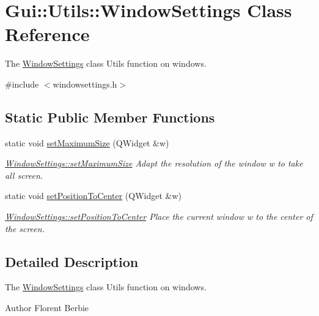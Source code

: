 \hypertarget{classGui_1_1Utils_1_1WindowSettings}{\section{Gui\-:\-:Utils\-:\-:Window\-Settings Class Reference}
\label{classGui_1_1Utils_1_1WindowSettings}
}


The \hyperlink{classGui_1_1Utils_1_1WindowSettings}{Window\-Settings} class Utils function on windows.  




{\ttfamily \#include $<$windowsettings.\-h$>$}

\subsection*{Static Public Member Functions}
\begin{DoxyCompactItemize}
\item 
static void \hyperlink{classGui_1_1Utils_1_1WindowSettings_a87db449398662e73bd6798efadabeb34}{set\-Maximum\-Size} (Q\-Widget \&w)
\begin{DoxyCompactList}\small\item\em \hyperlink{classGui_1_1Utils_1_1WindowSettings_a87db449398662e73bd6798efadabeb34}{Window\-Settings\-::set\-Maximum\-Size} Adapt the resolution of the window {\itshape w} to take all screen. \end{DoxyCompactList}\item 
static void \hyperlink{classGui_1_1Utils_1_1WindowSettings_a672a669c93a49565f4bbe06c7ad876c4}{set\-Position\-To\-Center} (Q\-Widget \&w)
\begin{DoxyCompactList}\small\item\em \hyperlink{classGui_1_1Utils_1_1WindowSettings_a672a669c93a49565f4bbe06c7ad876c4}{Window\-Settings\-::set\-Position\-To\-Center} Place the current window {\itshape w} to the center of the screen. \end{DoxyCompactList}\end{DoxyCompactItemize}


\subsection{Detailed Description}
The \hyperlink{classGui_1_1Utils_1_1WindowSettings}{Window\-Settings} class Utils function on windows. 

\begin{DoxyAuthor}{Author}
Florent Berbie 
\end{DoxyAuthor}



